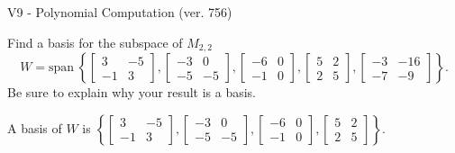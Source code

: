 \begin{exercise}
  \begin{exerciseTitle}V9 - Polynomial Computation (ver. 756)\end{exerciseTitle}
  \begin{exerciseStatement}
    Find a basis for the subspace of \(M_{2,2}\) 
\[W=\mathrm{span}\ \left\{\left[\begin{array}{cc}
3 & -5 \\
-1 & 3
\end{array}\right] , \left[\begin{array}{cc}
-3 & 0 \\
-5 & -5
\end{array}\right] , \left[\begin{array}{cc}
-6 & 0 \\
-1 & 0
\end{array}\right] , \left[\begin{array}{cc}
5 & 2 \\
2 & 5
\end{array}\right] , \left[\begin{array}{cc}
-3 & -16 \\
-7 & -9
\end{array}\right]\right\}.\]
 Be sure to explain why your result is a basis.


  \end{exerciseStatement}
  \begin{exerciseAnswer}
   A basis of \(W\) is  \(\left\{\left[\begin{array}{cc}
3 & -5 \\
-1 & 3
\end{array}\right] , \left[\begin{array}{cc}
-3 & 0 \\
-5 & -5
\end{array}\right] , \left[\begin{array}{cc}
-6 & 0 \\
-1 & 0
\end{array}\right] , \left[\begin{array}{cc}
5 & 2 \\
2 & 5
\end{array}\right]\right\}\).
  


  \end{exerciseAnswer}
\end{exercise}